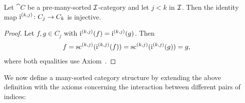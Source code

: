 \begin{proposition}
  \label{prop:PreManySortedCategory.injetive_idm}
  \leanok
  Let $\cat{C}$ be a pre-many-sorted $\mathcal{I}$-category and let $j < k$ in $\mathcal{I}$. Then the
  identity map $\operatorname{i}^{(k,j)} \colon C_j \to C_k$ is injective.
\end{proposition}

\begin{proof}
  \leanok
  Let $f, g \in C_j$ with $\operatorname{i}^{(k,j)}(f) = \operatorname{i}^{(k,j)}(g)$. Then
  \[
    f = \operatorname{sc}^{(k,j)}(\operatorname{i}^{(k,j)}(f)) = \operatorname{sc}^{(k,j)}(\operatorname{i}^{(k,j)}(g)) = g,
  \]
  where both equalities use Axiom~.
\end{proof}

We now define a many-sorted category structure by extending the above definition with the axioms
concerning the interaction between different pairs of indices:

